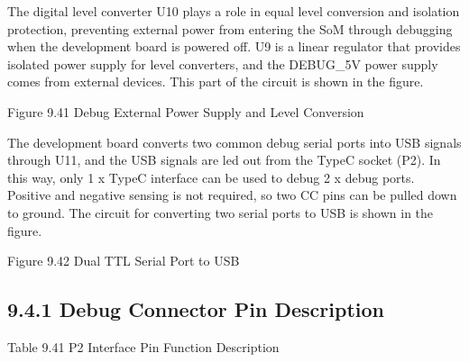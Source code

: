 \documentclass[letterpaper,10pt,openany,english]{sphinxmanual}
\begin{document}
\sphinxAtStartPar
The digital level converter U10 plays a role in equal level conversion and isolation protection, preventing external power from entering the SoM through debugging when the development board is powered off. U9 is a linear regulator that provides isolated power supply for level converters, and the DEBUG\_5V power supply comes from external devices. This part of the circuit is shown in the figure.

\sphinxAtStartPar
{}

\sphinxAtStartPar
Figure 9.4\sphinxhyphen{}1 Debug External Power Supply and Level Conversion

\sphinxAtStartPar
The development board converts two common debug serial ports into USB signals through U11, and the USB signals are led out from the Type\sphinxhyphen{}C socket (P2). In this way, only 1 x Type\sphinxhyphen{}C interface can be used to debug 2 x debug ports. Positive and negative sensing is not required, so two CC pins can be pulled down to ground. The circuit for converting two serial ports to USB is shown in the figure.

\sphinxAtStartPar
{}

\sphinxAtStartPar
Figure 9.4\sphinxhyphen{}2 Dual TTL Serial Port to USB


\subsection{9.4.1 Debug Connector Pin Description}
\label{\detokenize{hardware:debug-connector-pin-description}}
\sphinxAtStartPar
Table 9.4\sphinxhyphen{}1 P2 Interface Pin Function Description
\end{document}
